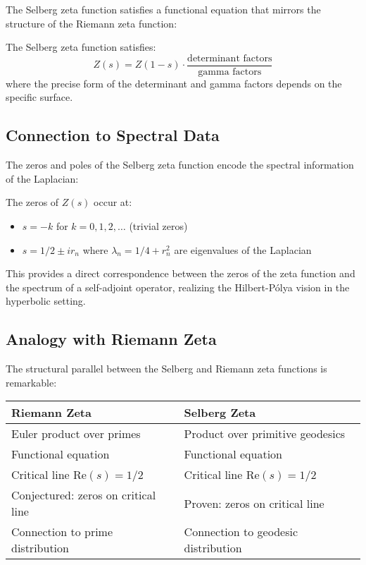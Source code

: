 The Selberg zeta function satisfies a functional equation that mirrors the structure of the Riemann zeta function:

\begin{theorem}
\label{thm:selberg_functional}
The Selberg zeta function satisfies:
$$Z(s) = Z(1-s) \cdot \frac{\text{determinant factors}}{\text{gamma factors}}$$
where the precise form of the determinant and gamma factors depends on the specific surface.
\end{theorem}

\subsection{Connection to Spectral Data}

The zeros and poles of the Selberg zeta function encode the spectral information of the Laplacian:

\begin{theorem}
\label{thm:selberg_zeros}
The zeros of $Z(s)$ occur at:
\begin{itemize}
\item $s = -k$ for $k = 0, 1, 2, \ldots$ (trivial zeros)
\item $s = 1/2 \pm ir_n$ where $\lambda_n = 1/4 + r_n^2$ are eigenvalues of the Laplacian
\end{itemize}
\end{theorem}

This provides a direct correspondence between the zeros of the zeta function and the spectrum of a self-adjoint operator, realizing the Hilbert-Pólya vision in the hyperbolic setting.

\subsection{Analogy with Riemann Zeta}

The structural parallel between the Selberg and Riemann zeta functions is remarkable:

\begin{center}
\begin{tabular}{|l|l|}
\hline
\textbf{Riemann Zeta} & \textbf{Selberg Zeta} \\
\hline
Euler product over primes & Product over primitive geodesics \\
Functional equation & Functional equation \\
Critical line $\text{Re}(s) = 1/2$ & Critical line $\text{Re}(s) = 1/2$ \\
Conjectured: zeros on critical line & Proven: zeros on critical line \\
Connection to prime distribution & Connection to geodesic distribution \\
\hline
\end{tabular}
\end{center}

